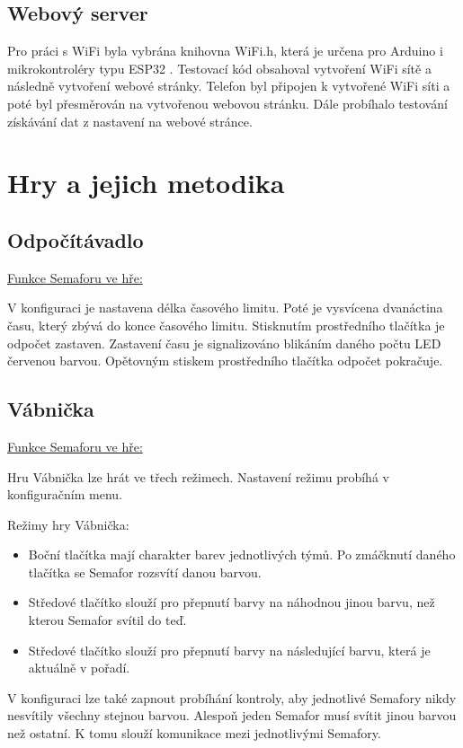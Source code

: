 \section{Webový server}

Pro práci s WiFi byla vybrána knihovna WiFi.h, která je určena pro Arduino i mikrokontroléry typu ESP32 \cite{WiFi_lib}. Testovací kód obsahoval vytvoření WiFi sítě a následně vytvoření webové 
stránky.  Telefon byl připojen k vytvořené WiFi síti a poté byl přesměrován na vytvořenou webovou stránku. Dále probíhalo testování získávání dat z nastavení na webové stránce. 


\chapter{Hry a jejich metodika}

\section{Odpočítávadlo}
\underline{Funkce Semaforu ve hře:}

V konfiguraci je nastavena délka časového limitu. Poté je vysvícena dvanáctina času, který zbývá do konce časového limitu. Stisknutím prostředního tlačítka je odpočet zastaven. 
Zastavení času je signalizováno blikáním daného počtu LED červenou barvou. Opětovným stiskem prostředního tlačítka odpočet pokračuje. 

\section{Vábnička}
\underline{Funkce Semaforu ve hře:}

Hru Vábnička lze hrát ve třech režimech. Nastavení režimu probíhá v konfiguračním menu. 

Režimy hry Vábnička: 
\begin{itemize} 
  \item Boční tlačítka mají charakter barev jednotlivých týmů. Po zmáčknutí daného tlačítka se Semafor rozsvítí danou barvou. 
  \item Středové tlačítko slouží pro přepnutí barvy na náhodnou jinou barvu, než kterou Semafor svítil do teď.  
  \item Středové tlačítko slouží pro přepnutí barvy na následující barvu, která je aktuálně v pořadí. 
\end{itemize}	
V konfiguraci lze také zapnout probíhání kontroly, aby jednotlivé Semafory nikdy nesvítily všechny stejnou barvou. Alespoň jeden Semafor musí svítit jinou barvou než ostatní. 
K tomu slouží komunikace mezi jednotlivými Semafory.

